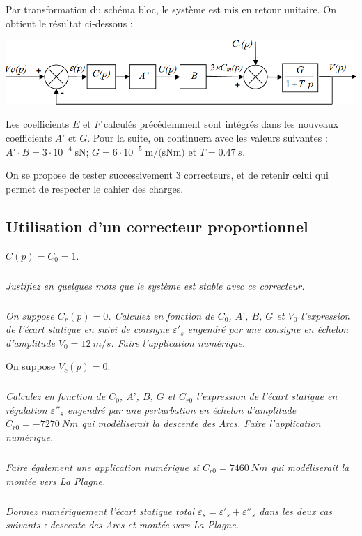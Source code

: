 \documentclass[10pt,fleqn]{article} %
\begin{document}
Par transformation du schéma bloc, le système est mis en retour unitaire. On obtient le résultat ci-dessous :
\begin{center}
	\includegraphics[width=\linewidth]{images2/fig_05}
\end{center}

	Les coefficients $E$ et $F$ calculés précédemment sont intégrés dans les nouveaux coefficients $A’$ et $G$. Pour la suite, on continuera avec les valeurs suivantes : $A'\cdot B=3\cdot 10^{-4}\;\text{sN}$; $G=6\cdot 10^{-5}\;\text{m/(sNm)}$ et $T=\SI{0,47}{s}$.
	
	
On se propose de tester successivement 3 correcteurs, et de retenir celui qui permet de respecter le cahier des charges.

\subsection{Utilisation d'un correcteur proportionnel}
$C(p)=C_0=1$.


\subparagraph{}
\textit{Justifiez en quelques mots que le système est stable avec ce correcteur.}

\subparagraph{}
\textit{On suppose $C_r(p)=0$. Calculez en fonction de $C_0$, $A’$, $B$, $G$ et $V_0$ l’expression de l’écart statique en suivi de consigne $\varepsilon'_s$ engendré par une consigne en échelon d’amplitude $V_0=\SI{12}{m/s}$. Faire l’application numérique.}

\vspace{.5cm}

On suppose $V_c(p)=0$.
\subparagraph{}
\textit{Calculez en fonction de $C_0$, $A’$, $B$, $G$ et $C_{r0}$ l’expression de l’écart statique en régulation $\varepsilon''_s$ engendré par une perturbation en échelon d’amplitude $C_{r0}=\SI{-7270}{Nm}$ qui modéliserait la descente des Arcs. Faire l’application numérique.}

\subparagraph{}
\textit{Faire également une application numérique si $C_{r0}=\SI{7460}{Nm}$ qui modéliserait la montée vers La Plagne.}

\subparagraph{}
\textit{Donnez numériquement l’écart statique total $\varepsilon_s=\varepsilon'_s+ \varepsilon''_s$  dans les deux cas suivants : descente des Arcs et montée vers La Plagne.}
\end{document}
